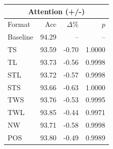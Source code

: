 \begin{tabular}{lrrr}
\toprule
\multicolumn{4}{c}{\textbf{Attention (+/-)}} \\
\midrule
Format & Acc & $\Delta$\% & $p$ \\
\midrule
Baseline & 94.29 & -- & -- \\
\midrule
TS & 93.59 & -0.70 & 1.0000 \\
TL & 93.73 & -0.56 & 0.9998 \\
STL & 93.72 & -0.57 & 0.9998 \\
STS & 93.66 & -0.63 & 1.0000 \\
TWS & 93.76 & -0.53 & 0.9995 \\
TWL & 93.85 & -0.44 & 0.9971 \\
NW & 93.71 & -0.58 & 0.9998 \\
POS & 93.80 & -0.49 & 0.9989 \\
\bottomrule
\end{tabular}